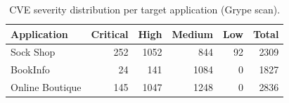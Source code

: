 \begin{table}[htbp]
\centering
\caption{CVE severity distribution per target application (Grype scan).}
\label{tab:scig_s1_severity}
\begin{tabular}{lrrrrr}
\toprule
\textbf{Application} & \textbf{Critical} & \textbf{High} & \textbf{Medium} & \textbf{Low} & \textbf{Total} \\
\midrule
Sock Shop & 252 & 1052 & 844 & 92 & 2309 \\
BookInfo & 24 & 141 & 1084 & 0 & 1827 \\
Online Boutique & 145 & 1047 & 1248 & 0 & 2836 \\
\bottomrule
\end{tabular}
\end{table}